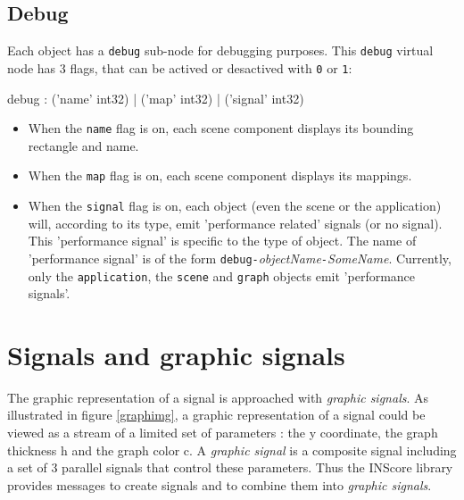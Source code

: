 \documentclass[a4paper,twoside]{report}
\newcommand{\toplevel}[1]	{\chapter{#1}}
\newcommand{\sublevel}[1]	{\section{#1}}
\newcommand{\OSC}[1]		{\texttt{#1}}
\begin{document}
\sublevel{Debug}

Each object has a \OSC{debug} sub-node for debugging purposes. This \OSC{debug} virtual node has 3 flags, that can be actived or desactived with \OSC{0} or \OSC{1}:

\begin{rail}
debug : 		('name'  int32)
		|	('map' int32)
		|	('signal' int32)
\end{rail}

\begin{itemize}
\item When the \OSC{name} flag is on, each scene component displays its bounding rectangle and name.
\item When the \OSC{map} flag is on, each scene component displays its mappings.
\item When the \OSC{signal} flag is on, each object (even the scene or the application) will, according to its type, emit 'performance related' signals (or no signal). This 'performance signal' is specific to the type of object. The name of 'performance signal' is of the form \OSC{debug-}\emph{objectName}\OSC{-}\emph{SomeName}. Currently, only the \OSC{application}, the \OSC{scene} and \OSC{graph} objects emit 'performance signals'.
\end{itemize}

\toplevel{Signals and graphic signals}
\label{graphsig}

The graphic representation of a signal is approached with \emph{graphic signals}. As illustrated in figure \ref{graphimg}, a graphic representation of a signal could be viewed as a stream of a limited set of parameters : the y coordinate, the graph thickness h and the graph color c. 
A \emph{graphic signal} is a composite signal including a set of 3 parallel signals that control these parameters. Thus the INScore library provides messages to create signals and to combine them into \emph{graphic signals}. 
\end{document}

